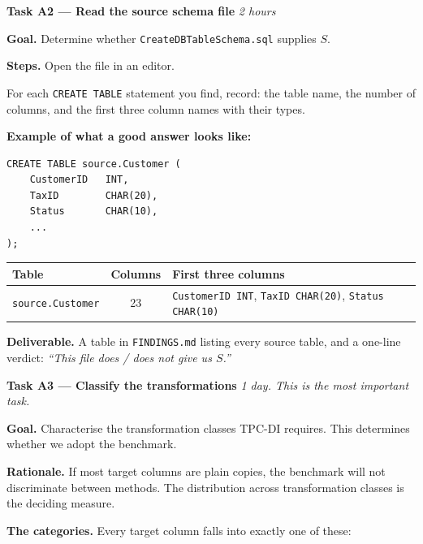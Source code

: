 \documentclass[11pt,a4paper]{article}
\newcommand{\code}[1]{\texttt{\small #1}}
\begin{document}
\vspace{4pt}
\begin{taskbox}
\textbf{Task A2 --- Read the source schema file} \hfill \emph{2 hours}
\end{taskbox}

\textbf{Goal.} Determine whether \code{CreateDBTableSchema.sql} supplies $S$.

\textbf{Steps.} Open the file in an editor.

For each \code{CREATE TABLE} statement you find, record: the table name, the number of
columns, and the first three column names with their types.

\textbf{Example of what a good answer looks like:}

\begin{lstlisting}[style=sql]
CREATE TABLE source.Customer (
    CustomerID   INT,
    TaxID        CHAR(20),
    Status       CHAR(10),
    ...
);
\end{lstlisting}
\begin{center}\small
\begin{tabular}{@{}lcl@{}}
\toprule
Table & Columns & First three columns \\
\midrule
\code{source.Customer} & 23 & \code{CustomerID INT}, \code{TaxID CHAR(20)}, \code{Status CHAR(10)} \\
\bottomrule
\end{tabular}
\end{center}

\textbf{Deliverable.} A table in \code{FINDINGS.md} listing every source table, and a
one-line verdict: \emph{``This file does / does not give us $S$.''}

\vspace{4pt}
\begin{taskbox}
\textbf{Task A3 --- Classify the transformations} \hfill \emph{1 day. This is the most important task.}
\end{taskbox}

\textbf{Goal.} Characterise the transformation classes TPC-DI requires. This determines
whether we adopt the benchmark.

\textbf{Rationale.} If most target columns are plain copies, the benchmark will not
discriminate between methods. The distribution across transformation classes is the
deciding measure.

\textbf{The categories.} Every target column falls into exactly one of these:
\end{document}
